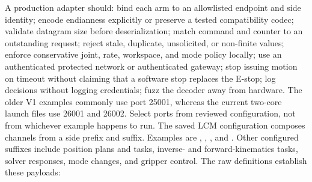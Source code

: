 {}A production adapter should:\markdownRendererInterblockSeparator
{}\markdownRendererOlBegin
{}bind each arm to an allowlisted endpoint and side identity;\markdownRendererOlItemEnd 
{}encode endianness explicitly or preserve a tested compatibility codec;\markdownRendererOlItemEnd 
{}validate datagram size before deserialization;\markdownRendererOlItemEnd 
{}match command and counter to an outstanding request;\markdownRendererOlItemEnd 
{}reject stale, duplicate, unsolicited, or non-finite values;\markdownRendererOlItemEnd 
{}enforce conservative joint, rate, workspace, and mode policy locally;\markdownRendererOlItemEnd 
{}use an authenticated protected network or authenticated gateway;\markdownRendererOlItemEnd 
{}stop issuing motion on timeout without claiming that a software stop replaces the E-stop;\markdownRendererOlItemEnd 
{}log decisions without logging credentials;\markdownRendererOlItemEnd 
{}fuzz the decoder away from hardware.\markdownRendererOlItemEnd 
\markdownRendererOlEnd \markdownRendererInterblockSeparator
{}The older V1 examples commonly use port 25001, whereas the current two-core launch files use 26001 and 26002. Select ports from reviewed configuration, not from whichever example happens to run.\markdownRendererInterblockSeparator
{}
\markdownRendererSectionEnd 
\markdownRendererSectionEnd \markdownRendererSectionBegin
{}\markdownRendererInterblockSeparator
{}The saved LCM configuration composes channels from a side prefix and suffix. Examples are , , , and . Other configured suffixes include position plans and tasks, inverse- and forward-kinematics tasks, solver responses, mode changes, and gripper control.\markdownRendererParagraphSeparator
{}The raw definitions establish these payloads:\markdownRendererInterblockSeparator
